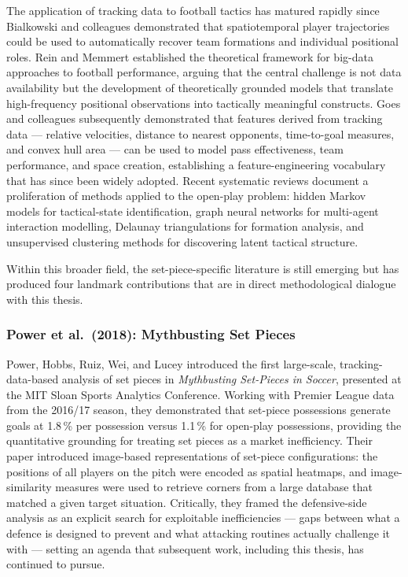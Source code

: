 The application of tracking data to football tactics has matured rapidly since
Bialkowski and colleagues \cite{Bialkowski2014, Bialkowski2016}
demonstrated that spatiotemporal player trajectories could be used to
automatically recover team formations and individual positional roles. Rein and
Memmert \cite{ReinMemmert2016} established the theoretical framework for
big-data approaches to football performance, arguing that the central challenge
is not data availability but the development of theoretically grounded models
that translate high-frequency positional observations into tactically meaningful
constructs. Goes and colleagues \cite{Goes2019, Goes2021} subsequently
demonstrated that features derived from tracking data --- relative velocities,
distance to nearest opponents, time-to-goal measures, and convex hull area
--- can be used to model pass effectiveness, team performance, and space
creation, establishing a feature-engineering vocabulary that has since been
widely adopted. Recent systematic reviews \citep{RicoGonzalez2023,
Clemente2025, OttingKarlis2023} document a proliferation of methods applied to
the open-play problem: hidden Markov models for tactical-state identification,
graph neural networks for multi-agent interaction modelling, Delaunay
triangulations for formation analysis, and unsupervised clustering methods for
discovering latent tactical structure.

Within this broader field, the set-piece-specific literature is still emerging
but has produced four landmark contributions that are in direct methodological
dialogue with this thesis.

\subsubsection{Power et al.\ (2018): Mythbusting Set Pieces}

Power, Hobbs, Ruiz, Wei, and Lucey \cite{Power2018} introduced the first
large-scale, tracking-data-based analysis of set pieces in \emph{Mythbusting
Set-Pieces in Soccer}, presented at the MIT Sloan Sports Analytics Conference.
Working with Premier League data from the 2016/17 season, they demonstrated that
set-piece possessions generate goals at 1.8\,\% per possession versus 1.1\,\% for
open-play possessions, providing the quantitative grounding for treating set
pieces as a market inefficiency. Their paper introduced image-based
representations of set-piece configurations: the positions of all players on
the pitch were encoded as spatial heatmaps, and image-similarity measures were
used to retrieve corners from a large database that matched a given target
situation. Critically, they framed the defensive-side analysis as an explicit
search for exploitable inefficiencies --- gaps between what a defence is designed
to prevent and what attacking routines actually challenge it with --- setting an
agenda that subsequent work, including this thesis, has continued to pursue.

